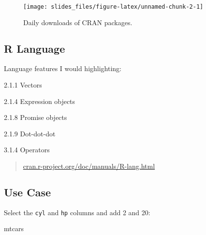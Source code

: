 \documentclass[]{article}
\newenvironment{Shaded}{\begin{snugshade}}{\end{snugshade}}
\newcommand{\NormalTok}[1]{#1}
\begin{document}
\begin{figure}

{\centering \texttt{[image: slides\_files/figure-latex/unnamed-chunk-2-1]} 

}

\caption{Daily downloads of CRAN packages.}\label{fig:unnamed-chunk-2}
\end{figure}

\hypertarget{r-language-1}{%
\subsection{R Language}\label{r-language-1}}

Language features I would highlighting:

2.1.1 Vectors

2.1.4 Expression objects

2.1.8 Promise objects

2.1.9 Dot-dot-dot

3.1.4 Operators

\begin{quote}
\href{https://cran.r-project.org/doc/manuals/R-lang.html}{cran.r-project.org/doc/manuals/R-lang.html}
\end{quote}

\hypertarget{use-case}{%
\subsection{Use Case}\label{use-case}}

Select the \texttt{cyl} and \texttt{hp} columns and add 2 and 20:

\begin{Shaded}
\begin{Highlighting}[]
\NormalTok{mtcars}
\end{Highlighting}
\end{Shaded}
\end{document}

